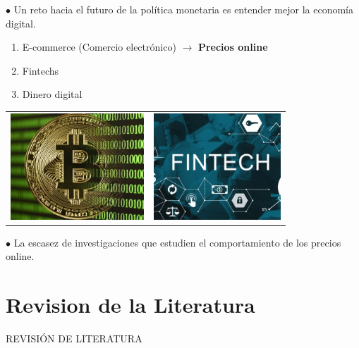 \documentclass[xcolor=dvipsnames]{beamer}
\begin{document}
\begin{frame}
$\bullet$ Un reto hacia el futuro de la pol\'itica monetaria es entender mejor la econom\'ia digital. \\
\begin{enumerate}
	\item E-commerce (Comercio electr\'onico) $\longrightarrow$ \textcolor[rgb]{0.55,0,0}{\textbf{Precios online}}
	\item Fintechs
	\item Dinero digital
\end{enumerate}
\begin{table}[h]
\begin{tabular}{cc}
\includegraphics[height=3.99cm, scale = 0.7]{N3.jpg} &
\includegraphics[height=3.99cm, scale =1.0]{N4.jpg} \\
\end{tabular}
\end{table}
$\bullet$ La escasez de investigaciones que estudien el comportamiento de los precios online. \\
\end{frame}

	
\section{Revision de la Literatura}
\begin{frame}
REVISI\'ON DE LITERATURA
\end{frame}
\end{document}
